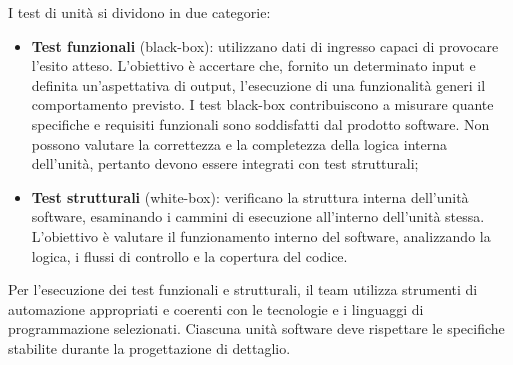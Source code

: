 \vspace{0.5\baselineskip}
\par I test di unità si dividono in due categorie:
\begin{itemize}
  \item \textbf{Test funzionali} (black-box): utilizzano dati di ingresso capaci di provocare l’esito atteso. L'obiettivo è accertare che, fornito un determinato input e definita un'aspettativa di output, l'esecuzione di una funzionalità generi il comportamento previsto. I test black-box contribuiscono a misurare quante specifiche e requisiti funzionali sono soddisfatti dal prodotto software. Non possono valutare la correttezza e la completezza della logica interna dell’unità, pertanto devono essere integrati con test strutturali;
  \item \textbf{Test strutturali} (white-box): verificano la struttura interna dell’unità software, esaminando i cammini di esecuzione all’interno dell’unità stessa. L'obiettivo è valutare il funzionamento interno del software, analizzando la logica, i flussi di controllo e la copertura del codice.
\end{itemize}

\vspace{0.5\baselineskip}
\par Per l'esecuzione dei test funzionali e strutturali, il team utilizza strumenti di automazione appropriati e coerenti con le tecnologie e i linguaggi di programmazione selezionati. Ciascuna unità software deve rispettare le specifiche stabilite durante la progettazione di dettaglio.

